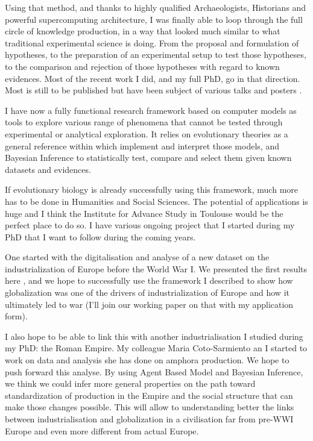 \documentclass[10pt]{article}
\begin{document}
Using that method, and thanks to highly qualified Archaeologists, Historians and powerful supercomputing architecture,  I was finally able to loop through the full circle of knowledge production, in a way that looked much similar to what traditional experimental science is doing. From the proposal and formulation of hypotheses, to the preparation of an experimental setup to test those hypotheses, to the comparison and rejection of those hypotheses with regard to known evidences. Most of the recent work I did, and my full PhD, go in that direction. Most is still to be published but have been subject of various talks and posters \cite{coto2016exploringamphorabetica,carrignon2018abmtrac,romanowska2018jerash,carrignon2017impactofdifferentsociallearningmechanismsontheemergenceofawalrasianequilibrium,carrignon2018hpcmodel,carrignon2018}. 

I have now a fully functional research framework based on computer models as tools to explore various range of phenomena that cannot be tested through experimental or analytical exploration. It relies on evolutionary theories as a general reference within which implement and interpret those models, and Bayesian Inference to statistically test, compare and select them given known datasets and evidences.

If evolutionary biology is already successfully using this framework, much more has to be done in Humanities and Social Sciences. The potential of applications is huge and I think the Institute for Advance Study in Toulouse would be the perfect place to do so. I have various ongoing project that I started during my PhD that I want to follow during the coming years.

One started with the digitalisation and analyse of a new dataset on the industrialization of Europe before the World War I. We presented the first results here \cite{carrignon2016patternsinglobalization}, and we hope to successfully use the framework I described to show how globalization was one of the drivers of industrialization of Europe and how it ultimately led to war (I'll join our working paper on that with my application form).

I also hope to be able to link this with another industrialisation I studied during my PhD: the Roman Empire. My colleague Maria Coto-Sarmiento an I started to work on data and analysis she has done on amphora production\cite{COTOSARMIENTO2018117}. We hope to push forward this analyse. By using Agent Based Model and Bayesian Inference, we think we could infer more general properties on the path toward standardization of production in the Empire and the social structure that can make those changes possible.  This will allow to understanding better the links between industrialisation and globalization in a civilisation far from pre-WWI Europe and even more different from actual Europe.
\end{document}
